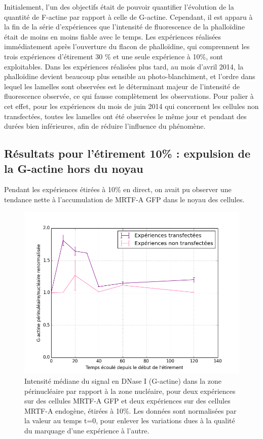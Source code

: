 \documentclass{report}
\begin{document}
Initialement, l'un des objectifs était de pouvoir quantifier l'évolution de la quantité de F-actine par rapport à celle de G-actine. Cependant, il est apparu à la fin de la série d'expériences que l'intensité de fluorescence de la phalloïdine était de moins en moins fiable avec le temps. Les expériences réalisées immédiatement après l'ouverture du flacon de phalloïdine, qui comprennent les trois expériences d'étirement 30 \% et une seule expérience à 10\%, sont exploitables. Dans les expériences réalisées plus tard, au mois d'avril 2014, la phalloïdine devient beaucoup plus sensible au photo-blanchiment, et l'ordre dans lequel les lamelles sont observées est le déterminant majeur de l'intensité de fluorescence observée, ce qui fausse complètement les observations. 
Pour palier à cet effet, pour les expériences du mois de juin 2014 qui concernent les cellules non transfectées, toutes les lamelles ont été observées le même jour et pendant des durées bien inférieures, afin de réduire l'influence du phénomène. 

\subsection{Résultats pour l'étirement 10\% : expulsion de la G-actine hors du noyau}

Pendant les expériences étirées à 10\% en direct, on avait pu observer une tendance nette à l'accumulation de MRTF-A GFP dans le noyau des cellules. 

\begin{figure}
\includegraphics[scale=0.5]{Figures/Et10_G_ratio.png} 
\caption{\label{Et10_G} Intensité médiane du signal en DNase I (G-actine) dans la zone périnucléaire par rapport à la zone nucléaire, pour deux expériences sur des cellules MRTF-A GFP et deux expériences sur des cellules MRTF-A endogène, étirées à 10\%. Les données sont normalisées par la valeur au temps t=0, pour enlever les variations dues à la qualité du marquage d'une expérience à l'autre.}
\end{figure}
\end{document}
